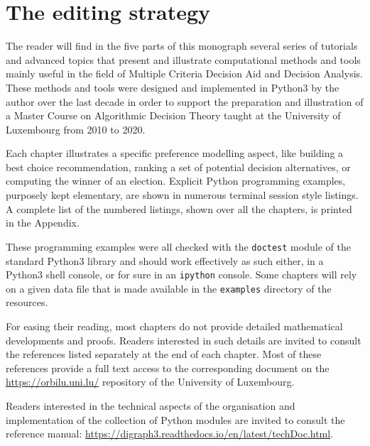 \label{sec:0}

{}
\section*{The editing strategy}
\label{sec:0.1}

The reader will find in the five parts of this monograph several series of tutorials and advanced topics that present and illustrate computational methods and tools mainly useful in the field of Multiple Criteria Decision Aid and Decision Analysis. These methods and tools were designed and implemented in Python3 by the author over the last decade in order to support the preparation and illustration of a Master Course on Algorithmic Decision Theory taught at the University of Luxembourg from 2010 to 2020.

Each chapter illustrates a specific preference modelling aspect, like building a best choice recommendation, ranking a set of potential decision alternatives, or computing the winner of an election. Explicit Python programming examples, purposely kept elementary, are shown in numerous terminal session style listings. A complete list of the numbered listings, shown over all the chapters, is printed in the Appendix. 

These programming examples were all checked with the \texttt{doctest} module of the standard Python3 library and should work effectively as such either, in a Python3 shell console, or for sure in an \texttt{ipython} console. Some chapters will rely on a given data file that is made available in the \texttt{examples} directory of the \Digraph resources. 

For easing their reading, most chapters do not provide detailed mathematical developments and proofs. Readers interested in such details are invited to consult the references listed separately at the end of each chapter. Most of these references provide a full text access to the corresponding document on the \href{https://orbilu.uni.lu/}{https://orbilu.uni.lu/} repository of the University of Luxembourg.

Readers interested in the technical aspects of the organisation and implementation of the collection of \Digraph Python modules are invited to consult the reference manual: \href{https://digraph3.readthedocs.io/en/latest/techDoc.html}{https://digraph3.readthedocs.io/en/latest/techDoc.html}.

{}
